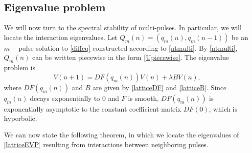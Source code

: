 \documentclass[12pt]{elsarticle}
\begin{document}
\subsection{Eigenvalue problem}

We will now turn to the spectral stability of multi-pulses. In particular, we will locate the interaction eigenvalues. Let $Q_m(n) = (q_m(n), q_m(n-1))$ be an $m-$pulse solution to \cref{diffeq} constructed according to \cref{ntmulti}. By \cref{ntmulti}, $Q_m(n)$ can be written piecewise in the form \cref{Upiecewise}. The eigenvalue problem is
\begin{equation}\label{multiEVP}
V(n+1) = DF(q_m(n)) V(n) + \lambda B V(n),
\end{equation}
where $DF(q_m(n))$ and $B$ are given by \cref{latticeDF} and \cref{latticeB}. Since $q_m(n)$ decays exponentially to 0 and $F$ is smooth, $DF(q_m(n))$ is exponentially asymptotic to the constant coefficient matrix $DF(0)$, which is hyperbolic.

We can now state the following theorem, in which we locate the eigenvalues of \cref{latticeEVP} resulting from interactions between neighboring pulses.
\end{document}
